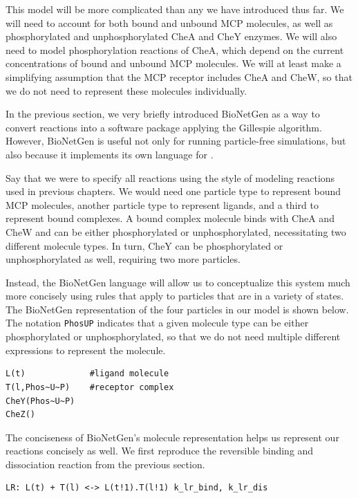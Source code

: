 This model will be more complicated than any we have introduced thus far. We will need to account for both bound and unbound MCP molecules, as well as phosphorylated and unphosphorylated CheA and CheY enzymes. We will also need to model phosphorylation reactions of CheA, which depend on the current concentrations of bound and unbound MCP molecules. We will at least make a simplifying assumption that the MCP receptor includes CheA and CheW, so that we do not need to represent these molecules individually.

In the previous section, we very briefly introduced BioNetGen as a way to convert reactions into a software package applying the Gillespie algorithm. However, BioNetGen is useful not only for running particle-free simulations, but also because it implements its own language for .

Say that we were to specify all reactions using the style of modeling reactions used in previous chapters. We would need one particle type to represent bound MCP molecules, another particle type to represent ligands, and a third to represent bound complexes. A bound complex molecule binds with CheA and CheW and can be either phosphorylated or unphosphorylated, necessitating two different molecule types. In turn, CheY can be phosphorylated or unphosphorylated as well, requiring two more particles.

Instead, the BioNetGen language will allow us to conceptualize this system much more concisely using rules that apply to particles that are in a variety of states. The BioNetGen representation of the four particles in our model is shown below. The notation \texttt{Phos\texttildelow U\texttildelow P} indicates that a given molecule type can be either phosphorylated or unphosphorylated, so that we do not need multiple different expressions to represent the molecule.

\begin{verbatim}
L(t)             #ligand molecule
T(l,Phos~U~P)    #receptor complex
CheY(Phos~U~P) 
CheZ()
\end{verbatim}

The conciseness of BioNetGen's molecule representation helps us represent our reactions concisely as well. We first reproduce the reversible binding and dissociation reaction from the previous section.

\begin{verbatim}
LR: L(t) + T(l) <-> L(t!1).T(l!1) k_lr_bind, k_lr_dis
\end{verbatim}

